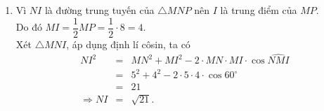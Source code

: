 \begin{bt}[1,5 điểm]
{\begin{enumerate}
			Mà $S_{\triangle MNP} = pr \Rightarrow r = \dfrac{S_{\triangle MNP}}{p} = \dfrac{10\sqrt{3}}{10} = \sqrt{3}$.\\
			Vậy bán kính đường tròn nội tiếp tam giác $MNP$ bằng $\sqrt{3}$.
			\item Vì $NI$ là đường trung tuyến của $\triangle MNP$ nên $I$ là trung điểm của $MP$.\\
			Do đó $MI = \dfrac{1}{2}MP = \dfrac{1}{2}\cdot 8 = 4$.\\
			Xét $\triangle MNI$, áp dụng định lí côsin, ta có
			\begin{eqnarray*}
				NI^2 &=& MN^2 + MI^2 - 2\cdot MN\cdot MI\cdot\cos\widehat{NMI}\\
				&=& 5^2 + 4^2 - 2\cdot 5\cdot 4\cdot \cos 60^\circ\\
				&=& 21\\
				\Rightarrow NI &=& \sqrt{21}.
			\end{eqnarray*}
		\end{enumerate}
	}
\end{bt}

